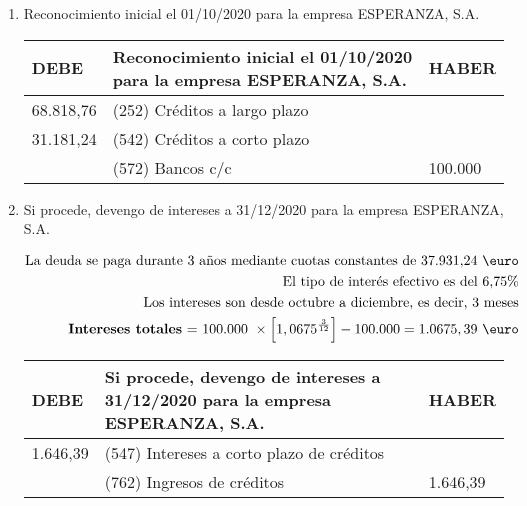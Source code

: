     \begin{enumerate}[label=\textbf{\alph*})]
        \item Reconocimiento inicial el 01/10/2020 para la empresa ESPERANZA, S.A.
        
        \begin{table}[H]
            \centering
            \begin{tabular}{|p{3cm}|p{6cm}|p{3cm}|}
            \hline
            \rowcolor{blue!30}
            \textbf{DEBE} & \textbf{Reconocimiento inicial el 01/10/2020 para la empresa ESPERANZA, S.A.} & \textbf{HABER} \\
            \hline
            68.818,76 & (252) Créditos a largo plazo & \\
            \hline
            31.181,24 & (542) Créditos a corto plazo & \\
            \hline
            & (572) Bancos c/c & 100.000 \\
            \hline
            \end{tabular}
        \end{table}

        \item Si procede, devengo de intereses a 31/12/2020 para la empresa ESPERANZA, S.A.
        
        \begin{align*}
            \text{La deuda se paga durante 3 años mediante cuotas constantes de 37.931,24 \euro} \\
            \text{El tipo de interés efectivo es del 6,75\%} \\
            \text{Los intereses son desde octubre a diciembre, es decir, 3 meses} \\
            \text{\textbf{Intereses totales} = 100.000 } \times \left[1,0675^{\frac{3}{12}}\right] - 100.000 = 1.0675,39 \text{ \euro} \\
        \end{align*}

        \begin{table}[H]
            \centering
            \begin{tabular}{|p{3cm}|p{6cm}|p{3cm}|}
            \hline
            \rowcolor{blue!30}
            \textbf{DEBE} & \textbf{Si procede, devengo de intereses a 31/12/2020 para la empresa ESPERANZA, S.A.} & \textbf{HABER} \\
            \hline
            1.646,39 & (547) Intereses a corto plazo de créditos & \\
            \hline
            & (762) Ingresos de créditos & 1.646,39 \\
            \hline
            \end{tabular}
        \end{table}


\end{enumerate}
